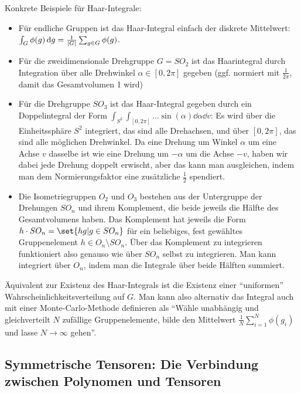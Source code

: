 \begin{definition}
	Konkrete Beispiele für Haar-Integrale:
	
	\begin{itemize}
	\item Für endliche Gruppen ist das Haar-Integral einfach der diskrete Mittelwert: $\int_G \phi(g) \,\textrm{d} g = \frac{1}{\lvert G\rvert} \sum_{g\in G} \phi(g)$.
	\item Für die zweidimensionale Drehgruppe $G=SO_2$ ist das Haarintegral durch Integration über alle Drehwinkel $\alpha\in[0,2\pi]$ gegeben (ggf. normiert mit $\frac{1}{2\pi}$, damit das Gesamtvolumen 1 wird)
	\item Für die Drehgruppe $SO_3$ ist das Haar-Integral gegeben durch ein Doppelintegral der Form $\int_{S^2} \int_{[0,2\pi]} \ldots \sin(\alpha)\dd \alpha \dd v$: Es wird über die Einheitssphäre $S^2$ integriert, das sind alle Drehachsen, und über $[0,2\pi]$, das sind alle möglichen Drehwinkel. Da eine Drehung um Winkel $\alpha$ um eine Achse $v$ dasselbe ist wie eine Drehung um $-\alpha$ um die Achse $-v$, haben wir dabei jede Drehung doppelt erwischt, aber das kann man ausgleichen, indem man dem Normierungsfaktor eine zusätzliche $\frac{1}{2}$ spendiert.
	\item Die Isometriegruppen $O_2$ und $O_3$ bestehen aus der Untergruppe der Drehungen $SO_n$ und ihrem Komplement, die beide jeweils die Hälfte des Gesamtvolumens haben. Das Komplement hat jeweils die Form $h\cdot SO_n = \set{hg | g\in SO_n}$ für ein beliebiges, fest gewähltes Gruppenelement $h\in O_n \setminus SO_n$. Über das Komplement zu integrieren funktioniert also genauso wie über $SO_n$ selbst zu integrieren. Man kann integriert über $O_n$, indem man die Integrale über beide Hälften summiert.
	\end{itemize}
	
	Äquivalent zur Existenz des Haar-Integrals ist die Existenz einer \enquote{uniformen} Wahrscheinlichkeitsverteilung auf $G$. Man kann also alternativ das Integral auch mit einer Monte-Carlo-Methode definieren als \enquote{Wähle unabhängig und gleichverteilt $N$ zufällige Gruppenelemente, bilde den Mittelwert $\frac{1}{N} \sum_{i=1}^N \phi(g_i)$ und lasse $N\to\infty$ gehen}.
\end{definition}

\subsection{Symmetrische Tensoren: Die Verbindung zwischen Polynomen und Tensoren}

